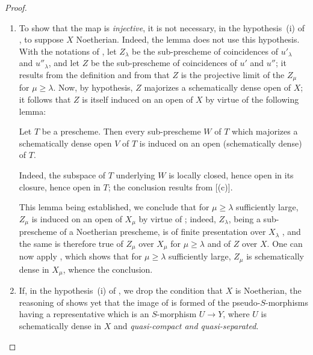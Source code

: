 \begin{proof}
\begin{remarks}[20.3.8.7]
\label{IV.20.3.8.7}
\begin{enumerate}[label=(\roman*)]
  \item To show that the map  is \emph{injective}, it is not necessary, in the hypothesis~(i) of , to suppose $X$ Noetherian.
  Indeed, the lemma  does not use this hypothesis.
  With the notations of , let $Z_\lambda$ be the sub-prescheme of coincidences of $u'_\lambda$ and $u''_\lambda$, and let $Z$ be the sub-prescheme of coincidences of $u'$ and $u''$;
  it results from the definition  and from  that $Z$ is the projective limit of the $Z_\mu$ for $\mu\geq\lambda$.
  Now, by hypothesis, $Z$ majorizes a schematically dense open of $X$;
  it follows that $Z$ is itself induced on an open of $X$ by virtue of the following lemma:

\begin{lemma}[20.3.8.8]
\label{IV.20.3.8.8}
Let $T$ be a prescheme.
Then every sub-prescheme $W$ of $T$ which majorizes a schematically dense open $V$ of $T$ is induced on an open (schematically dense) of $T$.
\end{lemma}

  Indeed, the subspace of $T$ underlying $W$ is locally closed, hence open in its closure, hence open in $T$;
  the conclusion results from [(c)].

  This lemma being established, we conclude that for $\mu\geq\lambda$ sufficiently large, $Z_\mu$ is induced on an open of $X_\mu$ by virtue of ; indeed, $Z_\lambda$, being a sub-prescheme of a Noetherian prescheme, is of finite presentation over $X_\lambda$ , and the same is therefore true of $Z_\mu$ over $X_\mu$ for $\mu\geq\lambda$ and of $Z$ over $X$.
  One can now apply , which shows that for $\mu\geq\lambda$ sufficiently large, $Z_\mu$ is schematically dense in $X_\mu$, whence the conclusion.

  \item If, in the hypothesis~(i) of , we drop the condition that $X$ is Noetherian, the reasoning of  shows yet that the image of  is formed of the pseudo-$S$-morphisms having a representative which is an $S$-morphism $U\to Y$, where $U$ is schematically dense in $X$ and \emph{quasi-compact and quasi-separated}.
\end{enumerate}
\end{remarks}
\end{proof}

